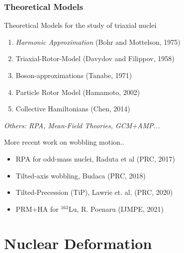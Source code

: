 \documentclass[
	11pt, %
]{beamer}
\begin{document}
\begin{frame}
	\frametitle{Theoretical Models}
	\begin{block}{Theoretical Models for the study of triaxial nuclei}
		\begin{enumerate}
			\item \emph{Harmonic Approximation} (Bohr and Mottelson, 1975)
			\item Triaxial-Rotor-Model (Davydov and Filippov, 1958)
			\item Boson-approximations (Tanabe, 1971)
			\item Particle Rotor Model (Hamamoto, 2002)
			\item Collective Hamiltonians (Chen, 2014)
		\end{enumerate}
		\emph{Others: RPA, Mean-Field Theories, GCM+AMP...}
	\end{block}
	
	\begin{exampleblock}{More recent work on wobbling motion..}
		\begin{itemize}
			\item RPA for odd-mass nuclei, Raduta et al (PRC, 2017)
			\item Tilted-axis wobbling, Budaca (PRC, 2018)
			\item Tilted-Precession (TiP), Lawrie et. al. (PRC, 2020)
			\item PRM+HA for $^{163}$Lu, R. Poenaru (IJMPE, 2021)
		\end{itemize}
	\end{exampleblock}

\end{frame}

		
\section{Nuclear Deformation}
\end{document}
